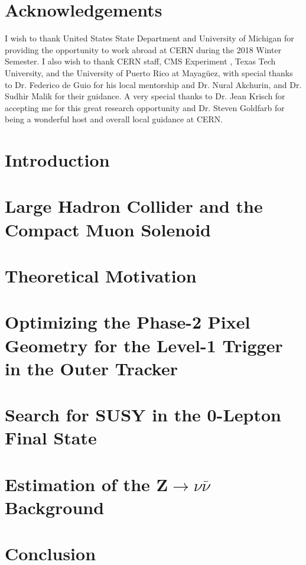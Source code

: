 \documentclass[12pt,twoside,openany]{book}
\begin{document}
\chapter*{Acknowledgements}


I wish to thank United States State Department and University of Michigan for providing the opportunity to work abroad at CERN during the 2018 Winter Semester. I also wish to thank CERN staff, CMS Experiment , Texas Tech University, and the University of Puerto Rico at Mayagüez, with special thanks to Dr. Federico de Guio for his local mentorship and Dr. Nural Akchurin, and Dr. Sudhir Malik for their guidance. A very special thanks to Dr. Jean Krisch for accepting me for this great research opportunity and Dr. Steven Goldfarb for being a wonderful host and overall local guidance at CERN.

\listoffigures

\tableofcontents

\mainmatter
\chapter{Introduction}


\chapter{Large Hadron Collider and the Compact Muon Solenoid}\label{LHCCMS}


\chapter{Theoretical Motivation}\label{theory}


\chapter{Optimizing the Phase-2 Pixel Geometry for the Level-1 Trigger in the Outer Tracker}\label{stubs}


\chapter{Search for SUSY in the 0-Lepton Final State}\label{AnalysisChap}


\chapter{Estimation of the Z$\rightarrow \nu\bar{\nu}$ Background}\label{estimation}


\chapter{Conclusion}\label{conclusion}


\appendix
%

{}

\end{document}
